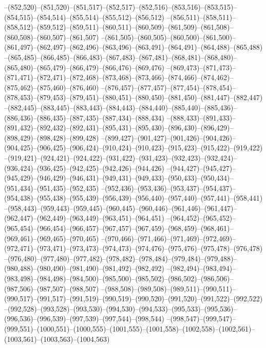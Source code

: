 --(852,520)--(851,520)--(851,517)--(852,517)--(852,516)--(853,516)--(853,515)--(854,515)--(854,514)--(855,514)--(855,512)--(856,512)
--(856,511)--(858,511)--(858,512)--(859,512)--(859,511)--(860,511)--(860,509)--(861,509)--(861,508)--(860,508)--(860,507)--(861,507)
--(861,505)--(860,505)--(860,500)--(861,500)--(861,497)--(862,497)--(862,496)--(863,496)--(863,491)--(864,491)--(864,488)--(865,488)
--(865,485)--(866,485)--(866,483)--(867,483)--(867,481)--(868,481)--(868,480)--(865,480)--(865,479)--(866,479)--(866,476)--(869,476)
--(869,473)--(871,473)--(871,471)--(872,471)--(872,468)--(873,468)--(873,466)--(874,466)--(874,462)--(875,462)--(875,460)--(876,460)
--(876,457)--(877,457)--(877,454)--(878,454)--(878,453)--(879,453)--(879,451)--(880,451)--(880,450)--(881,450)--(881,447)--(882,447)
--(882,445)--(883,445)--(883,443)--(884,443)--(884,440)--(885,440)--(885,436)--(886,436)--(886,435)--(887,435)--(887,434)--(888,434)
--(888,433)--(891,433)--(891,432)--(892,432)--(892,431)--(895,431)--(895,430)--(896,430)--(896,429)--(898,429)--(898,428)--(899,428)
--(899,427)--(901,427)--(901,426)--(904,426)--(904,425)--(906,425)--(906,424)--(910,424)--(910,423)--(915,423)--(915,422)--(919,422)
--(919,421)--(924,421)--(924,422)--(931,422)--(931,423)--(932,423)--(932,424)--(936,424)--(936,425)--(942,425)--(942,426)--(944,426)
--(944,427)--(945,427)--(945,429)--(946,429)--(946,431)--(949,431)--(949,433)--(950,433)--(950,434)--(951,434)--(951,435)--(952,435)
--(952,436)--(953,436)--(953,437)--(954,437)--(954,438)--(955,438)--(955,439)--(956,439)--(956,440)--(957,440)--(957,441)--(958,441)
--(958,443)--(959,443)--(959,445)--(960,445)--(960,446)--(961,446)--(961,447)--(962,447)--(962,449)--(963,449)--(963,451)--(964,451)
--(964,452)--(965,452)--(965,454)--(966,454)--(966,457)--(967,457)--(967,459)--(968,459)--(968,461)--(969,461)--(969,465)--(970,465)
--(970,466)--(971,466)--(971,469)--(972,469)--(972,471)--(973,471)--(973,473)--(974,473)--(974,476)--(975,476)--(975,478)--(976,478)
--(976,480)--(977,480)--(977,482)--(978,482)--(978,484)--(979,484)--(979,488)--(980,488)--(980,490)--(981,490)--(981,492)--(982,492)
--(982,494)--(983,494)--(983,498)--(984,498)--(984,500)--(985,500)--(985,502)--(986,502)--(986,506)--(987,506)--(987,507)--(988,507)
--(988,508)--(989,508)--(989,511)--(990,511)--(990,517)--(991,517)--(991,519)--(990,519)--(990,520)--(991,520)--(991,522)--(992,522)
--(992,528)--(993,528)--(993,530)--(994,530)--(994,533)--(995,533)--(995,536)--(996,536)--(996,539)--(997,539)--(997,544)--(998,544)
--(998,547)--(999,547)--(999,551)--(1000,551)--(1000,555)--(1001,555)--(1001,558)--(1002,558)--(1002,561)--(1003,561)--(1003,563)--(1004,563)
